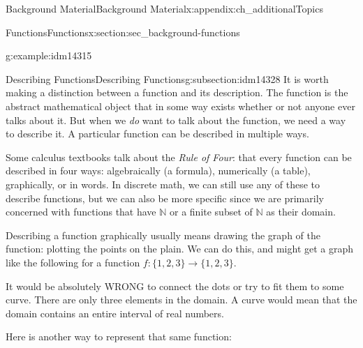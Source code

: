 \documentclass[oneside,10pt,]{book}
\numberwithin{equation}{chapter}
\def\N{\mathbb N}
\begin{document}
\begin{appendixptx}{Background Material}{}{Background Material}{}{}{x:appendix:ch_additionalTopics}
\begin{sectionptx}{Functions}{}{Functions}{}{}{x:section:sec_background-functions}
\begin{introduction}{}
\begin{example}{}{g:example:idm14315}
\begin{enumerate}
\end{enumerate}
%
\end{example}
\end{introduction}%
%
%
\typeout{************************************************}
\typeout{************************************************}
%
\begin{subsectionptx}{Describing Functions}{}{Describing Functions}{}{}{g:subsection:idm14328}
It is worth making a distinction between a function and its description.  The function is the abstract mathematical object that in some way exists whether or not anyone ever talks about it.  But when we \emph{do} want to talk about the function, we need a way to describe it.  A particular function can be described in multiple ways.%
\par
Some calculus textbooks talk about the \emph{Rule of Four}: that every function can be described in four ways: algebraically (a formula), numerically (a table), graphically, or in words.  In discrete math, we can still use any of these to describe functions, but we can also be more specific since we are primarily concerned with functions that have \(\N\) or a finite subset of \(\N\) as their domain.%
\par
Describing a function graphically usually means drawing the graph of the function: plotting the points on the plain. We can do this, and might get a graph like the following for a function \(f:\{1,2,3\} \to \{1,2,3\}\).%
\begin{sidebyside}{1}{0.35}{0.35}{0}%
\begin{sbspanel}{0.3}%
%
\end{sbspanel}%
\end{sidebyside}%
\par
It would be absolutely WRONG to connect the dots or try to fit them to some curve. There are only three elements in the domain. A curve would mean that the domain contains an entire interval of real numbers.%
\par
Here is another way to represent that same function:%
\begin{sidebyside}{1}{0.415}{0.415}{0}%
\begin{sbspanel}{0.17}%

\end{sbspanel}
\end{sidebyside}
\end{subsectionptx}
\end{sectionptx}
\end{appendixptx}
\end{document}
